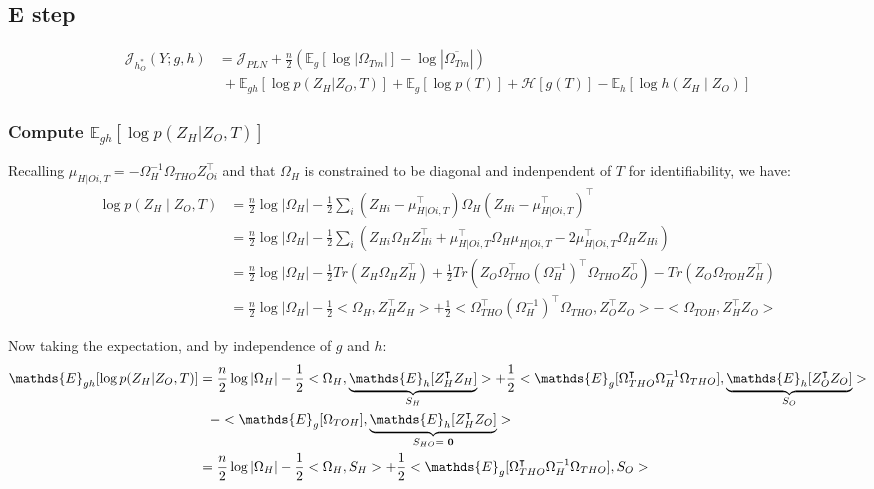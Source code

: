 \documentclass[11pt,a4paper]{article}
\newcommand{\Esp}{\mathds{E}}
\newcommand{\entr}{\mathcal{H}}
\begin{document}
\subsection{E step}
\begin{align*}
\mathcal{J}_{h_O^*}(Y; g,h)&= \mathcal{J}_{PLN}+\frac{n}{2}\left(\Esp_g[\log|\Omega_{Tm}|] - \log|\overline{\Omega_{Tm}}|\right)\\
&\;+ \Esp_{gh}[\log p(Z_H | Z_O,T) ]+\Esp_g[\log p(T)] +\entr[g(T)]-\Esp_h[\log h(Z_H\mid Z_O)]
\end{align*}


\subsubsection{Compute  $\Esp_{gh}[\log p(Z_H | Z_O,T) ]$}
Recalling $\mu_{H|Oi,T} = -\Omega_H^{-1}\Omega_{THO}Z_{Oi} ^\intercal $ and that $\Omega_H$ is constrained to be diagonal and indenpendent of $T$ for identifiability, we have:
\begin{align*}
\log p(Z_H\mid Z_O,T) &= \frac{n}{2} \log |\Omega_H| -\frac{1}{2} \sum_i (Z_{Hi}-\mu_{H|Oi,T}^\intercal )\Omega_H(Z_{Hi}-\mu_{H|Oi,T}^\intercal )^\intercal \\
&= \frac{n}{2} \log |\Omega_H| -\frac{1}{2} \sum_i \left(Z_{Hi}\Omega_HZ_{Hi}^\intercal  + \mu_{H|Oi,T}^\intercal \Omega_H\mu_{H|Oi,T} - 2\mu_{H|Oi,T}^\intercal \Omega_HZ_{Hi} \right)\\
&= \frac{n}{2} \log |\Omega_H| -\frac{1}{2}Tr(Z_H\Omega_HZ_H^\intercal ) + \frac{1}{2} Tr(Z_O\Omega_{THO}^\intercal (\Omega_H^{-1})^\intercal \Omega_{THO}Z_O^\intercal ) - Tr(Z_O\Omega_{TOH}Z_H^\intercal)\\
&=\frac{n}{2} \log |\Omega_H| -\frac{1}{2}<\Omega_H,Z_H^\intercal Z_H> + \frac{1}{2} <\Omega_{THO}^\intercal (\Omega_H^{-1})^\intercal \Omega_{THO},Z_O^\intercal Z_O>- <\Omega_{TOH},Z_H^\intercal Z_O>
\end{align*}


Now taking the expectation, and by independence of $g$ and $h$:
\begin{align*}
\Esp_{gh}[\log p(Z_H | Z_O,T) ] &=\frac{n}{2} \log |\Omega_H| -\frac{1}{2} <\Omega_H,\underbrace{\Esp_h[Z_H^\intercal Z_H]}_{S_H}> +\frac{1}{2} <\Esp_g[\Omega_{THO}^\intercal \Omega_H^{-1}\Omega_{THO}],\underbrace{\Esp_{h}[Z_O^\intercal Z_O]}_{S_O}> \\
&\;\;\; -<\Esp_g[\Omega_{TOH}],\underbrace{\Esp_h[Z_H^\intercal Z_O]}_{S_{HO} = \text{ \bf{0}}}>\\
&=\frac{n}{2} \log |\Omega_H| -\frac{1}{2} <\Omega_H, S_H> + \frac{1}{2}<\Esp_g[\Omega_{THO}^\intercal \Omega_H^{-1}\Omega_{THO}], S_O>
\end{align*}\\
\end{document}
